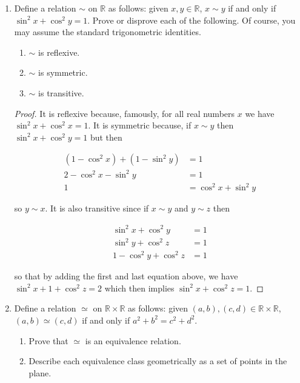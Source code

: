 \documentclass[12pt]{article}
\begin{document}
{\begin{enumerate}
\begin{proof}
    Therefore $A\times (B\cap C)=(A\times B)\cap (A\times C)$.
  \end{proof}

\item Define a relation $\sim$ on $\mathbb{R}$ as follows: given $x, y \in \mathbb{R}$, $x \sim y$ if and only if $\sin^2 x + \cos^2 y = 1$. Prove or disprove each of the following. Of course, you may assume the standard trigonometric identities.
	\begin{enumerate}
	\item $\sim$ is reflexive.
	\item $\sim$ is symmetric.
	\item $\sim$ is transitive.
	\end{enumerate}

  \begin{proof}
    It is reflexive because, famously, for all real numbers $x$ we have $\sin^2 x+\cos^2 x = 1$.  It is symmetric because, if $x\sim y$ then $\sin^2x+\cos^2y=1$ but then

    \begin{align*}
      (1-\cos^2 x)+(1-\sin^2 y) &= 1\\
      2-\cos^2 x - \sin^2 y &= 1\\
      1 &= \cos^2 x + \sin^2 y
    \end{align*}

    so $y\sim x$.  It is also transitive since if $x\sim y$ and $y\sim z$ then

    \begin{align*}
      \sin^2x+\cos^2y &= 1\\
      \sin^2y+\cos^2z &= 1\\
      1-\cos^2y + \cos^2 z &=1
    \end{align*}

    so that by adding the first and last equation above, we have $\sin^2x+1+\cos^2 z = 2$ which then implies $\sin^2x+\cos^2z=1$.
  \end{proof}


\item Define a relation $\simeq$ on $\mathbb{R} \times \mathbb{R}$ as follows: given $(a,b), (c,d) \in \mathbb{R} \times \mathbb{R}$, $(a,b) \simeq (c,d)$ if and only if $a^2 + b^2 = c^2 + d^2$.
\begin{enumerate}
\item Prove that $\simeq$ is an equivalence relation.
\item Describe each equivalence class geometrically as a set of points in the plane.
\end{enumerate}


\end{enumerate}}
\end{document}

